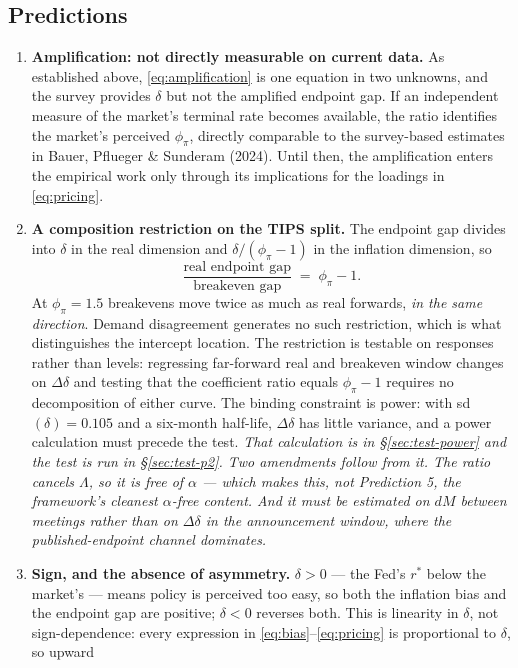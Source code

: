 \documentclass[11pt]{article}
\begin{document}
\subsection{Predictions}
\label{sec:predictions}
\begin{enumerate}\setlength\itemsep{0.25em}
\item \textbf{Amplification: not directly measurable on current data.} As established above,
\eqref{eq:amplification} is one equation in two unknowns, and the survey provides $\delta$ but
not the amplified endpoint gap. If an independent measure of the market's terminal rate becomes
available, the ratio identifies the market's perceived $\phi_\pi$, directly comparable to the
survey-based estimates in Bauer, Pflueger \& Sunderam (2024). Until then, the amplification
enters the empirical work only through its implications for the loadings in
\eqref{eq:pricing}.
\item \textbf{A composition restriction on the TIPS split.} The endpoint gap divides into
$\delta$ in the real dimension and $\delta/(\phi_\pi-1)$ in the inflation dimension, so
\[
\frac{\text{real endpoint gap}}{\text{breakeven gap}} \;=\; \phi_\pi - 1 .
\]
At $\phi_\pi=1.5$ breakevens move twice as much as real forwards, \emph{in the same direction}.
Demand disagreement generates no such restriction, which is what distinguishes the intercept
location. The restriction is testable on responses rather than levels: regressing far-forward
real and breakeven window changes on $\Delta\delta$ and testing that the coefficient ratio
equals $\phi_\pi-1$ requires no decomposition of either curve. The binding constraint is
power: with sd$(\delta)=0.105$ and a six-month half-life, $\Delta\delta$ has little variance,
and a power calculation must precede the test. \emph{That calculation is in
\S\ref{sec:test-power} and the test is run in \S\ref{sec:test-p2}. Two amendments follow from
it. The ratio cancels $\Lambda$, so it is free of $\alpha$ --- which makes this, not
Prediction 5, the framework's cleanest $\alpha$-free content. And it must be estimated on
$dM$ between meetings rather than on $\Delta\delta$ in the announcement window, where the
published-endpoint channel dominates.}
\item \textbf{Sign, and the absence of asymmetry.} $\delta>0$ --- the Fed's $r^{*}$ below the
market's --- means policy is perceived too easy, so both the inflation bias and the endpoint gap
are positive; $\delta<0$ reverses both. This is linearity in $\delta$, not sign-dependence:
every expression in \eqref{eq:bias}--\eqref{eq:pricing} is proportional to $\delta$, so upward

\end{enumerate}
\end{document}
